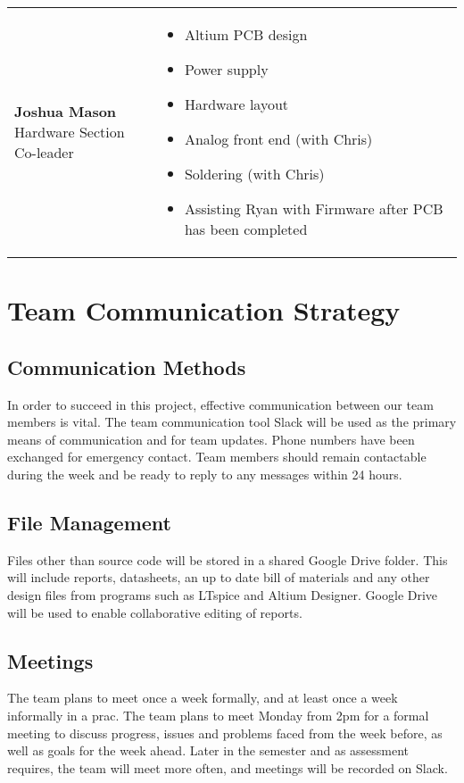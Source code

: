 \documentclass[12pt]{report}
\begin{document}
\begin{tabular}{l p{}}
	\pbox{20cm}{\textbf{Joshua Mason} \\ Hardware Section Co-leader} &
	{\begin{itemize}
		\item Altium PCB design
		\item Power supply
		\item Hardware layout
		\item Analog front end (with Chris)
		\item Soldering (with Chris)
		\item Assisting Ryan with Firmware after PCB has been completed
	\end{itemize}}\\
	
\end{tabular}

\chapter{Team Communication Strategy}
\section{Communication Methods}
In order to succeed in this project, effective communication between our team members is vital. The team communication tool Slack will be used as the primary means of communication and for team updates. Phone numbers have been exchanged for emergency contact. Team members should remain contactable during the week and be ready to reply to any messages within 24 hours.
\section{File Management}
Files other than source code will be stored in a shared Google Drive folder. This will include reports, datasheets, an up to date bill of materials and any other design files from programs such as LTspice and Altium Designer. Google Drive will be used to enable collaborative editing of reports.
\section{Meetings}
The team plans to meet once a week formally, and at least once a week informally in a prac. The team plans to meet Monday from 2pm for a formal meeting to discuss progress, issues and problems faced from the week before, as well as goals for the week ahead. Later in the semester and as assessment requires, the team will meet more often, and meetings will be recorded on Slack.
\end{document}

